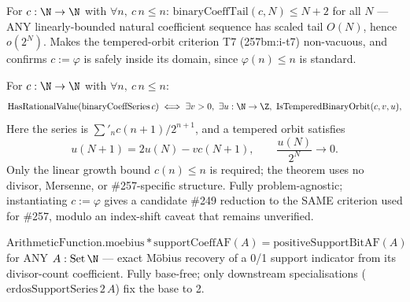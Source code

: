\begin{thm}
For $c:\N\to\N$ with $\forall n,\ c\,n\le n$: $\mathrm{binaryCoeffTail}(c,N)\le N+2$ for all $N$ —
ANY linearly-bounded natural coefficient sequence has scaled tail $O(N)$, hence $o(2^N)$. Makes
the tempered-orbit criterion T7 (257bm:i-t7) non-vacuous, and confirms $c:=\varphi$ is safely
inside its domain, since $\varphi(n)\le n$ is standard.
\par\noindent{}   
\end{thm}

\begin{thm}
For $c:\N\to\N$ with $\forall n,\ c\,n\le n$:
\[
\mathrm{HasRationalValue}(\mathrm{binaryCoeffSeries}\,c) \;\Longleftrightarrow\; \exists v>0,\ \exists u:\N\to\Z,\ \mathrm{IsTemperedBinaryOrbit}(c,v,u),
\]
Here the series is $\sum'_n c(n{+}1)/2^{n+1}$, and a tempered orbit satisfies
\[
u(N{+}1)=2u(N)-v c(N{+}1),\qquad \frac{u(N)}{2^N}\longrightarrow0.
\]
Only the linear growth bound $c(n)\le n$ is required; the theorem uses no divisor,
Mersenne, or \#257-specific structure.
Fully problem-agnostic; instantiating $c:=\varphi$ gives a candidate \#249 reduction to the SAME
criterion used for \#257, modulo an index-shift caveat that remains unverified.
\par\noindent{}     
\end{thm}

\begin{thm}
$\mathrm{ArithmeticFunction.moebius} * \mathrm{supportCoeffAF}(A) = \mathrm{positiveSupportBitAF}(A)$
for ANY $A:\mathrm{Set}\,\N$ — exact M\"obius recovery of a 0/1 support indicator from its
divisor-count coefficient. Fully base-free; only downstream specialisations
($\mathrm{erdosSupportSeries}\,2\,A$) fix the base to 2.
\par\noindent{}     
\end{thm}

